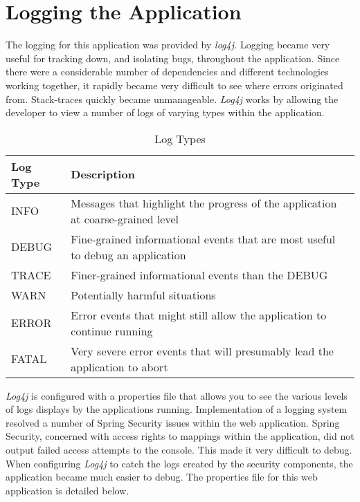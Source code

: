 \section{Logging the Application}

The logging for this application was provided by \textit{log4j.} Logging became very useful for tracking down, and isolating bugs, throughout the application. Since there were a considerable number of dependencies and different technologies working together, it rapidly became very difficult to see where errors originated from. Stack-traces quickly became unmanageable. \textit{Log4j} works by allowing the developer to view a number of logs of varying types within the application.
\begin{table}[H]
\begin{center}
    \begin{tabular}{ | l | l | p{5cm} |}
    \hline
    Log Type & Description \\ \hline
    INFO & Messages that highlight the progress of the application at coarse-grained level  \\ \hline
    DEBUG & Fine-grained informational events that are most useful to debug an application\\ \hline
	TRACE & Finer-grained informational events than the DEBUG\\ \hline
	WARN & Potentially harmful situations\\ \hline
	ERROR & Error events that might still allow the application to continue running\\ \hline
    FATAL & Very severe error events that will presumably lead the application to abort\\ \hline
    \end{tabular}
\end{center}
\caption{Log Types}
\end{table}

\textit{Log4j} is configured with a properties file that allows you to see the various levels of logs displays by the applications running. Implementation of a logging system resolved a number of Spring Security issues within the web application. Spring Security, concerned with access rights to mappings within the application, did not output failed access attempts to the console. This made it very difficult to debug. When configuring \textit{Log4j} to catch the logs created by the security components, the application became much easier to debug. The properties file for this web application is detailed below.


